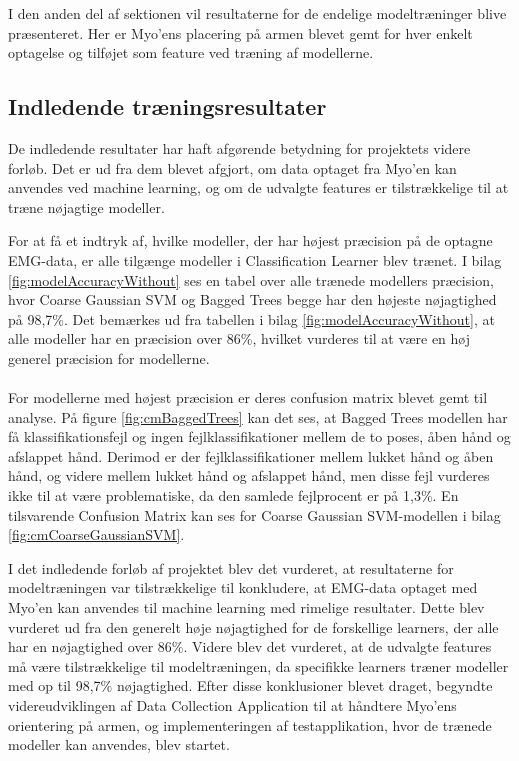 I den anden del af sektionen vil resultaterne for de endelige modeltræninger blive præsenteret. Her er Myo'ens placering på armen blevet gemt for hver enkelt optagelse og tilføjet som feature ved træning af modellerne.

\subsection{Indledende træningsresultater}
De indledende resultater har haft afgørende betydning for projektets videre forløb. Det er ud fra dem blevet afgjort, om data optaget fra Myo'en kan anvendes ved machine learning, og om de udvalgte features er tilstrækkelige til at træne nøjagtige modeller. 
 
For at få et indtryk af, hvilke modeller, der har højest præcision på de optagne EMG-data, er alle tilgænge modeller i Classification Learner blev trænet. I bilag \ref{fig:modelAccuracyWithout} ses en tabel over alle trænede modellers præcision, hvor Coarse Gaussian SVM og Bagged Trees begge har den højeste nøjagtighed på 98,7\%.
Det bemærkes ud fra tabellen i bilag \ref{fig:modelAccuracyWithout}, at alle modeller har en præcision over 86\%, hvilket vurderes til at være en høj generel præcision for modellerne. 
\\\\
For modellerne med højest præcision er deres confusion matrix blevet gemt til analyse. På figure \ref{fig:cmBaggedTrees} kan det ses, at Bagged Trees modellen har få klassifikationsfejl og ingen fejlklassifikationer mellem de to poses, åben hånd og afslappet hånd. Derimod er der fejlklassifikationer mellem lukket hånd og åben hånd, og videre mellem lukket hånd og afslappet hånd, men disse fejl vurderes ikke til at være problematiske, da den samlede fejlprocent er på 1,3\%. En tilsvarende Confusion Matrix kan ses for Coarse Gaussian SVM-modellen i bilag \ref{fig:cmCoarseGaussianSVM}. 
 
 I det indledende forløb af projektet blev det vurderet, at resultaterne for modeltræningen var tilstrækkelige til konkludere, at EMG-data optaget med Myo'en kan anvendes til machine learning med rimelige resultater. Dette blev vurderet ud fra den generelt høje nøjagtighed for de forskellige learners, der alle har en nøjagtighed over 86\%. Videre blev det vurderet, at de udvalgte features må være tilstrækkelige til modeltræningen, da specifikke learners træner modeller med op til 98,7\% nøjagtighed. Efter disse konklusioner blevet draget, begyndte videreudviklingen af Data Collection Application til at håndtere Myo'ens orientering på armen, og implementeringen af testapplikation, hvor de trænede modeller kan anvendes, blev startet.

